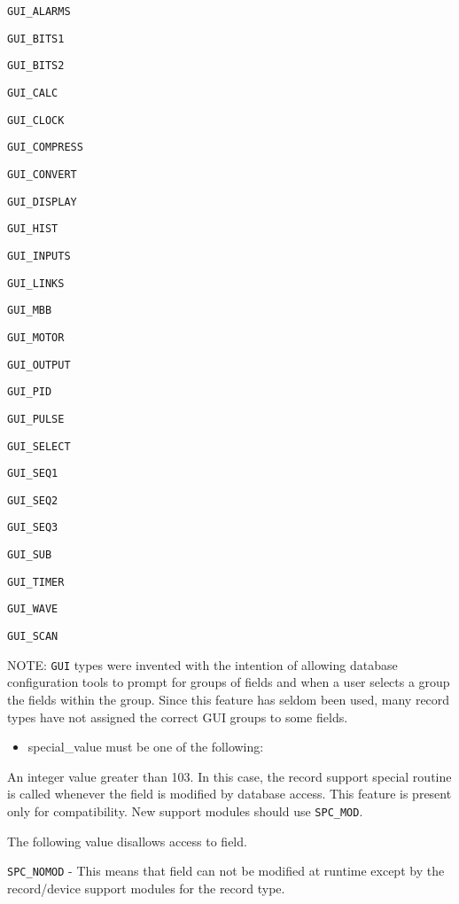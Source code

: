 \verb|GUI_ALARMS|

\verb|GUI_BITS1|

\verb|GUI_BITS2|

\verb|GUI_CALC|

\verb|GUI_CLOCK|

\verb|GUI_COMPRESS|

\verb|GUI_CONVERT|

\verb|GUI_DISPLAY|

\verb|GUI_HIST|

\verb|GUI_INPUTS|

\verb|GUI_LINKS|

\verb|GUI_MBB|

\verb|GUI_MOTOR|

\verb|GUI_OUTPUT|

\verb|GUI_PID|

\verb|GUI_PULSE|

\verb|GUI_SELECT|

\verb|GUI_SEQ1|

\verb|GUI_SEQ2|

\verb|GUI_SEQ3|

\verb|GUI_SUB|

\verb|GUI_TIMER|

\verb|GUI_WAVE|

\verb|GUI_SCAN|

NOTE: \verb|GUI| types were invented with the intention of allowing database configuration tools to prompt for 
groups of fields and when a user selects a group the fields within the group. Since this feature has seldom 
been used, many record types have not assigned the correct GUI groups to some fields.

\begin{itemize}\item {}special\_value must be one of the following:

\end{itemize}An integer value greater than 103. In this case, the record support special routine is called whenever the field 
is modified by database access. This feature is present only for compatibility. New support modules should 
use \verb|SPC_MOD|.



The following value disallows access to field.

\verb|SPC_NOMOD| - This means that field can not be modified at runtime except by the record/device support 
modules for the record type.

